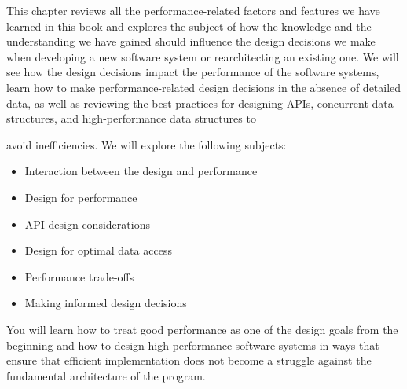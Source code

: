 This chapter reviews all the performance-related factors and features we have learned in this book and explores the subject of how the knowledge and the understanding we have gained should influence the design decisions we make when developing a new software system or rearchitecting an existing one. We will see how the design decisions impact the performance of the software systems, learn how to make performance-related design decisions in the absence of detailed data, as well as reviewing the best practices for designing APIs, concurrent data structures, and high-performance data structures to 

avoid inefficiencies. We will explore the following subjects:

\begin{itemize}
\item 
Interaction between the design and performance

\item 
Design for performance

\item 
API design considerations

\item 
Design for optimal data access

\item 
Performance trade-offs

\item 
Making informed design decisions
\end{itemize}

You will learn how to treat good performance as one of the design goals from the beginning and how to design high-performance software systems in ways that ensure that efficient implementation does not become a struggle against the fundamental architecture of the program.